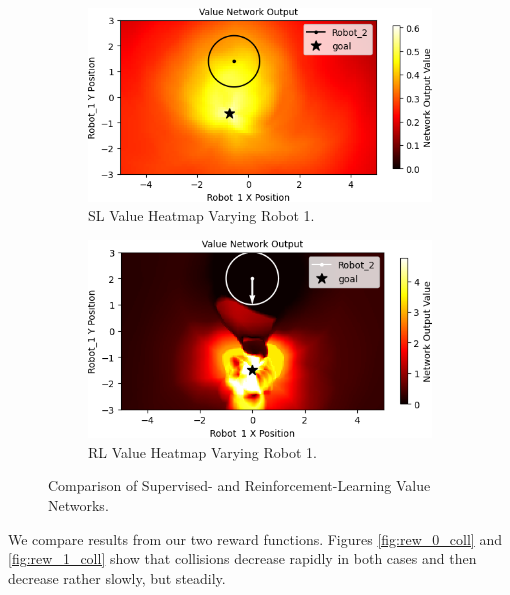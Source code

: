 \documentclass[conference]{IEEEtran}
\begin{document}
\begin{figure}[t]
    \centering
    \begin{subfigure}[b]{0.49\textwidth}
         \centering
         \includegraphics[width=\textwidth]{docs/latex/figures/heatmap_2_Robot_1.png}
         \caption{SL Value Heatmap Varying Robot 1.}
         \label{fig:heatmap_21}
     \end{subfigure}
     \hfill
     \begin{subfigure}[b]{0.49\textwidth}
         \centering
         \includegraphics[width=\textwidth]{docs/latex/figures/heatmap_rl_robot1.png}
         \caption{RL Value Heatmap Varying Robot 1.}
         \label{fig:heatmap_22}
     \end{subfigure}
     \caption{Comparison of Supervised- and Reinforcement-Learning Value Networks.}\label{fig:heatmap_2}
\end{figure}

We compare results from our two reward functions. Figures \ref{fig:rew_0_coll} and \ref{fig:rew_1_coll} show that collisions decrease rapidly in both cases and then decrease rather slowly, but steadily. 
\end{document}
